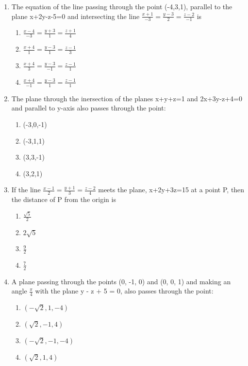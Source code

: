 \begin{enumerate}[label=\arabic*.,ref=\thesubsection.\theenumi]
\item The equation of the line passing through the point (-4,3,1), parallel to the plane x+2y-z-5=0 and intersecting the line $\frac{x+1}{-3}=\frac{y-3}{2}=\frac{z-2}{-1}$ is
\begin{enumerate}
\item $\frac{x-4}{-3}=\frac{y+3}{1}=\frac{z+1}{4}$
\item $\frac{x+4}{1}=\frac{y-3}{1}=\frac{z-1}{3}$
\item $\frac{x+4}{3}=\frac{y-3}{-1}=\frac{z-1}{1}$
\item $\frac{x+4}{-1}=\frac{y-3}{1}=\frac{z-1}{1}$
\end{enumerate}

\item The plane through the inersection of the planes x+y+z=1 and 2x+3y-z+4=0 and parallel to y-axis also passes through the point:
\begin{enumerate}
\item (-3,0,-1)
\item (-3,1,1)
\item (3,3,-1)
\item (3,2,1)
\end{enumerate}

\item If the line $\frac{x-1}{2}=\frac{y+1}{3}=\frac{z-2}{4}$ meets the plane, x+2y+3z=15 at a point P, then the distance of P from the origin is
\begin{enumerate}
\item $\frac{\sqrt{5}}{2}$
\item $2\sqrt{5}$
\item $\frac{9}{2}$
\item $\frac{7}{2}$
\end{enumerate}

\item A plane passing through the points (0, -1, 0) and (0, 0, 1) and making an angle $\frac{\pi}{4}$ with the plane y - z + 5 = 0, also passes through the point:
\begin{enumerate}
\item $(-\sqrt{2}, 1, -4)$
\item $(\sqrt{2}, -1, 4)$
\item $(-\sqrt{2}, -1, -4)$
\item $(\sqrt{2}, 1, 4)$
\end{enumerate}


\end{enumerate}
